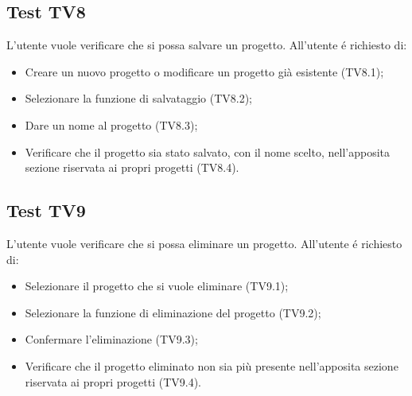 \subsection{Test TV8}
L'utente vuole verificare che si possa salvare un progetto. \newline
All'utente \'e richiesto di:
\begin{itemize}
	\item Creare un nuovo progetto o modificare un progetto già esistente (TV8.1);
	\item Selezionare la funzione di salvataggio (TV8.2);
	\item Dare un nome al progetto (TV8.3);
	\item Verificare che il progetto sia stato salvato, con il nome scelto, nell'apposita sezione riservata ai propri progetti (TV8.4).
\end{itemize}

\subsection{Test TV9}
L'utente vuole verificare che si possa eliminare un progetto. \newline
All'utente \'e richiesto di:
\begin{itemize}
	\item Selezionare il progetto che si vuole eliminare (TV9.1);
	\item Selezionare la funzione di eliminazione del progetto (TV9.2);
	\item Confermare l'eliminazione (TV9.3);
	\item Verificare che il progetto eliminato non sia più presente nell'apposita sezione riservata ai propri progetti (TV9.4).
\end{itemize}
